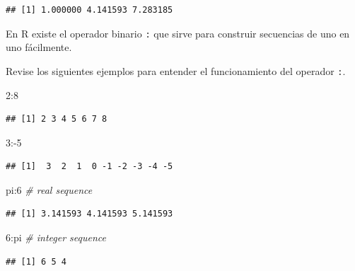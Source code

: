 \documentclass[
]{book}
\makeatletter
\newenvironment{Shaded}{\begin{snugshade}}{\end{snugshade}}
\newcommand{\CommentTok}[1]{\textcolor[rgb]{0.56,0.35,0.01}{\textit{#1}}}
\newcommand{\DecValTok}[1]{\textcolor[rgb]{0.00,0.00,0.81}{#1}}
\newcommand{\NormalTok}[1]{#1}
\newcommand{\SpecialCharTok}[1]{\textcolor[rgb]{0.00,0.00,0.00}{#1}}
\newenvironment{kframe}{%
\medskip{}
\setlength{\fboxsep}{.8em}
 \def\at@end@of@kframe{}%
 \ifinner\ifhmode%
  \def\at@end@of@kframe{\end{minipage}}%
  \begin{minipage}{\columnwidth}%
 \fi\fi%
 \def\FrameCommand##1{\hskip\@totalleftmargin \hskip-\fboxsep
 \colorbox{shadecolor}{##1}\hskip-\fboxsep
     \hskip-\linewidth \hskip-\@totalleftmargin \hskip\columnwidth}%
 \MakeFramed {\advance\hsize-\width
   \@totalleftmargin\z@ \linewidth\hsize
   \@setminipage}}%
 {\par\unskip\endMakeFramed%
 \at@end@of@kframe}
\renewenvironment{Shaded}{\begin{kframe}}{\end{kframe}}
\newenvironment{rmdblock}[1]
  {
  \begin{itemize}
  \renewcommand{\labelitemi}{
    \raisebox{-.7\height}[0pt][0pt]{
      {\setkeys{Gin}{width=3em,keepaspectratio}\texttt{[image: images/\#1]}}
    }
  }
  \setlength{\fboxsep}{1em}
  \begin{kframe}
  \item
  }
  {
  \end{kframe}
  \end{itemize}
  }
\newenvironment{rmdnote}
  {\begin{rmdblock}{note}}
  {\end{rmdblock}}
\makeatother
\begin{document}
\begin{verbatim}
## [1] 1.000000 4.141593 7.283185
\end{verbatim}

\begin{rmdnote}
En R existe el operador binario \texttt{:} que sirve para construir secuencias de uno en uno fácilmente.
\end{rmdnote}

Revise los siguientes ejemplos para entender el funcionamiento del operador \texttt{:}.

\begin{Shaded}
\begin{Highlighting}[]
\DecValTok{2}\SpecialCharTok{:}\DecValTok{8}
\end{Highlighting}
\end{Shaded}

\begin{verbatim}
## [1] 2 3 4 5 6 7 8
\end{verbatim}

\begin{Shaded}
\begin{Highlighting}[]
\DecValTok{3}\SpecialCharTok{:{-}}\DecValTok{5}
\end{Highlighting}
\end{Shaded}

\begin{verbatim}
## [1]  3  2  1  0 -1 -2 -3 -4 -5
\end{verbatim}

\begin{Shaded}
\begin{Highlighting}[]
\NormalTok{pi}\SpecialCharTok{:}\DecValTok{6}  \CommentTok{\# real sequence}
\end{Highlighting}
\end{Shaded}

\begin{verbatim}
## [1] 3.141593 4.141593 5.141593
\end{verbatim}

\begin{Shaded}
\begin{Highlighting}[]
\DecValTok{6}\SpecialCharTok{:}\NormalTok{pi  }\CommentTok{\# integer sequence}
\end{Highlighting}
\end{Shaded}

\begin{verbatim}
## [1] 6 5 4
\end{verbatim}
\end{document}
